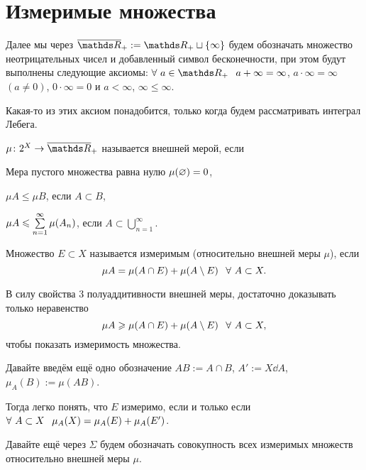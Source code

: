 \section{Измеримые множества}

Далее мы через $\ol\R_+:=\R_+\sqcup\{\infty\}$ будем обозначать множество неотрицательных чисел и добавленный символ бесконечности, при этом будут выполнены следующие аксиомы:
$\forall\ a\in\R_+\pau a+\infty =\infty$, $a\cdot\infty=\infty$ $(a\ne 0)$, $0\cdot\infty = 0$ и $a<\infty$, $\infty\le \infty$.

Какая-то из этих аксиом понадобится, только когда будем рассматривать интеграл Лебега.

\begin{Def}
  $\mu\colon 2^X\to\ol \R_+$ называется внешней мерой, если
\begin{roItems}
 \item Мера пустого множества равна нулю $\mu(\varnothing)=0$,
 \item $\mu A\le \mu B$,  если $A\subset B$,
 \item $\mu A\leqslant \sum\limits_{n = 1}^{\infty}\mu(A_n)$, если $A\subset \bigcup\limits_{n=1}^\infty$.
\end{roItems}
\end{Def}

\begin{Def}
  Множество $E\subset X$ называется измеримым (относительно внешней меры $\mu$), если 
\[\mu A = \mu (A\cap E) + \mu(A\dd E)\pau\forall\ A\subset X.\]
\end{Def}

В силу свойства 3 полуаддитивности внешней меры, достаточно доказывать только неравенство 
\[\mu A\ge \mu(A\cap E)+\mu(A\dd E)\pau \forall\ A\subset X,\]
 чтобы показать измеримость множества.

Давайте введём ещё одно обозначение $AB:=A\cap B$, $A':=X\dd A$, $\mu_A(B):=\mu(AB)$.

Тогда легко понять, что $E$ измеримо, если и только если $\forall\ A\subset X\pau \mu_A(X)=\mu_A(E)+\mu_A(E')$.

Давайте ещё через $\Sigma$ будем обозначать совокупность всех измеримых множеств относительно внешней меры $\mu$.

